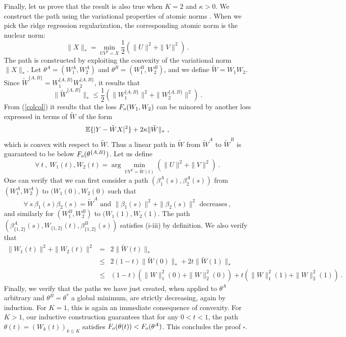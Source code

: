 Finally, let us prove that the result is also true when $K=2$ and $\kappa>0$.
We construct the path using the variational properties of atomic norms \cite{bach2013convex}. 
When we pick the ridge regression regularization, the corresponding atomic norm is the 
nuclear norm:
$$\| X \|_{*} = \min_{UV^T = X} \frac{1}{2}( \| U \|^2 + \| V \|^2)~.$$
The path is constructed by exploiting the convexity of the variational norm $\| X\|_{*}$. 
Let $\theta^A = (W_1^A, W_2^A)$ and $\theta^B=(W_1^B, W_2^B)$, and we 
define $\tilde{W} = W_1 W_2$. Since $\tilde{W}^{\{A,B\}} = W_1^{\{A,B\}} W_2^{\{A,B\}} $, 
it results that
\begin{equation}
\label{colcol}
\| \tilde{W}^{\{A,B\}} \|_* \leq \frac{1}{2} ( \| W_1^{\{A,B\}}\|^2 + \| W_2^{\{A,B\}}\|^2)~.
\end{equation}
From (\ref{colcol}) it results that the loss $F_{o}(W_1, W_2)$ can be minored by another loss 
 expressed in terms of $\tilde{W}$ of the form 
$${\mathbb{E}} \{ | Y - \tilde{W} X |^2 \} + 2\kappa \| \tilde{W} \|_*~,$$ 
which is convex with respect to $\tilde{W}$. Thus a linear path in $\tilde{W}$ from 
$\tilde{W}^A$ to $\tilde{W}^B$ is guaranteed to be below $F_{o}(\theta^{\{A,B\}})$. 
Let us define 
$$\forall~t~,~W_{1}(t), W_{2}(t) = \arg\min_{UV^T= \tilde{W}(t)} (\| U\|^2 + \|V \|^2)~. $$ 
One can verify that we can first consider a path $(\beta^A_1(s), \beta^A_2(s))$ 
from $(W_1^{A}, W_2^{A})$ to $(W_{1}(0), W_{2}(0)$ such that 
$$\forall~s~\beta_1(s) \beta_2(s) = \tilde{W}^A \text{ and } \| \beta_1(s) \|^2 + \| \beta_2(s) \|^2 \text{ decreases} ~,$$
and similarly for $(W_1^{B}, W_2^{B})$ to $(W_{1}(1), W_{2}(1)$.
The path $(\beta_{\{1,2\}}^A(s), W_{\{1,2\}}(t), \beta_{\{1,2\}}^B(s))$ satisfies (i-iii) by definition. We also verify that 
\begin{eqnarray*}
\| W_{1}(t) \|^2 + \| W_{2}(t) \|^2 &=& 2 \| \tilde{W}(t)\|_{*}   \\
&\leq & 2 (1-t) \|  \tilde{W}(0)\|_{*} + 2 t  \|  \tilde{W}(1)\|_{*} \\ 
&\leq & (1-t) ( \| W \|_{1}^2(0) + \| W \|_{2}^2(0)  ) + t (\| W \|_{1}^2(1) + \| W \|_{2}^2(1))~.
\end{eqnarray*}
Finally, we verify that the paths we have just created, when applied to $\theta^A$ arbitrary and 
$\theta^B = \theta^*$ a global minimum, are strictly decreasing, again by induction. 
For $K=1$, this is again an immediate consequence of convexity. 
For $K>1$, our inductive construction guarantees that for any $0<t<1$, 
the path $\theta(t) = (W_k(t))_{k \leq K}$ satisfies $F_{o}(\theta(t)) < F_{o}(\theta^A)$. 
 This concludes the proof $\square$. 

